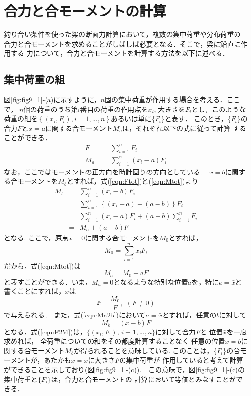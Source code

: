 \documentclass[10pt,a4j]{jbook}
\begin{document}
\section{合力と合モーメントの計算}
釣り合い条件を使った梁の断面力計算において，複数の集中荷重や分布荷重の
合力と合モーメントを求めることがしばしば必要となる．そこで，梁に鉛直に作用する
力について，合力と合モーメントを計算する方法を以下に述べる．
\subsection{集中荷重の組}
図\ref{fig:fig9_1}-(a)に示すように，$n$固の集中荷重が作用する場合を考える．ここで，
$n$個の荷重のうち第$i$番目の荷重の作用点を$x_i$, 大きさを$F_i$とし，このような
荷重の組を$\left\{ \left(x_i, F_i\right), i=1,\dots ,n\right\}$あるいは単に$\{F_i\}$と表す．
このとき，$\{F_i\}$の合力$F$と$x=a$に関する合モーメント$M_a$は，ぞれぞれ以下の式に従って計算
することができる．
\begin{eqnarray}
	F &=& \sum_{i=1}^n F_i 
	\label{eqn:Ftot}
	\\
	M_a &=& \sum_{i=1}^n (x_i-a)F_i 
	\label{eqn:Mtot}
\end{eqnarray}
なお，ここではモーメントの正方向を時計回りの方向としている．
$x=b$に関する合モーメントを$M_b$とすれば，式(\ref{eqn:Ftot})と(\ref{eqn:Mtot})より
\begin{eqnarray}
	M_b &=& \sum_{i=1}^n (x_i-b)F_i  \nonumber \\
	    &=& \sum_{i=1}^n \left\{ (x_i-a)+(a-b)\right\}F_i  \nonumber \\
	    &=& \sum_{i=1}^n (x_i-a)F_i +(a-b)\sum_{i=1}^n F_i  \nonumber \\
	    &=& M_a +(a-b)F 
	\label{eqn:Ma2b}
\end{eqnarray}
となる. ここで，原点$x=0$に関する合モーメントを$M_0$とすれば，
\begin{equation}
	M_0= \sum_{i=1}^n x_i F_i 
	\label{eqn:M0}
\end{equation}
だから，式(\ref{eqn:Mtot})は
\begin{equation}
	M_a = M_0 -aF 
	\label{eqn:}
\end{equation}
と表すことができる．いま，$M_a=0$となるような特別な位置$a$を，特に$a=\bar x$と
書くことにすれば，$\bar x$は
\begin{equation}
	\bar{x} = \frac{M_0}{F}, \ \ (F\neq 0)
	\label{eqn:xbar}
\end{equation}
で与えられる． また，式(\ref{eqn:Ma2b})において$a=\bar x$とすれば，任意の$b$に対して
\begin{equation}
	M_b= \left( \bar x - b\right) F
	\label{eqn:F2M}
\end{equation}
となる．式(\ref{eqn:F2M})は，$\{ (x_i, F_i),\, i=1,\dots ,n\}$に対して合力$F$と
位置$\bar x$を一度求めれば， 全荷重についての和をその都度計算することなく
任意の位置$x=b$に関する合モーメント$M_b$が得られることを意味している.
このことは，$\{F_i\}$の合モーメントが，あたかも$x=\bar x$に大きさ$F$の集中荷重が
作用していると考えて計算ができることを示しており(図\ref{fig:fig9_1}-(c))．
この意味で，図\ref{fig:fig9_1}-(c)の集中荷重と$\{ F_i\}$は，合力と合モーメントの
計算において等価とみなすことができる．
\end{document}
